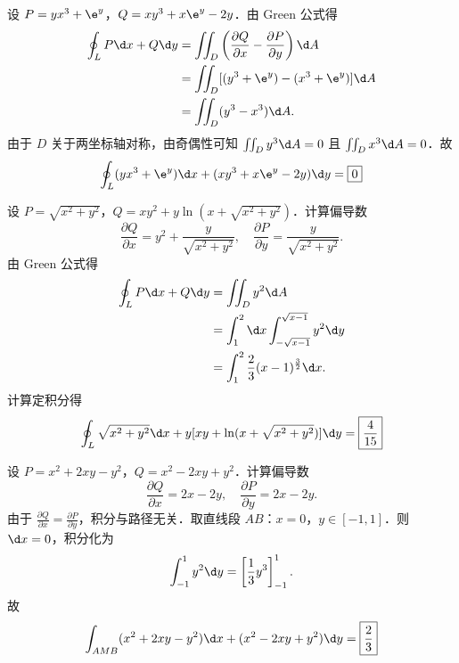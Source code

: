 \begin{solution}
    设 $P = yx^3 + \e^y$，$Q = xy^3 + x\e^y - 2y$．由 Green 公式得
    \begin{equation}
        \begin{aligned}
            \oint_L P \d x + Q \d y & = \iint_D \left( \frac{\partial Q}{\partial x} - \frac{\partial P}{\partial y} \right) \d A \\
                                    & = \iint_D [(y^3 + \e^y) - (x^3 + \e^y)] \d A                                                \\
                                    & = \iint_D (y^3 - x^3) \d A.
        \end{aligned}
    \end{equation}
    由于 $D$ 关于两坐标轴对称，由奇偶性可知 $\iint_D y^3 \d A = 0$ 且 $\iint_D x^3 \d A = 0$．故
    \begin{equation}
        \oint_L (yx^3 + \e^y) \d x + (xy^3 + x\e^y - 2y) \d y = \boxed{0}
    \end{equation}


    设 $P = \sqrt{x^2+y^2}$，$Q = xy^2 + y\ln(x + \sqrt{x^2+y^2})$．计算偏导数
    \begin{equation}
        \frac{\partial Q}{\partial x} = y^2 + \frac{y}{\sqrt{x^2+y^2}}, \quad \frac{\partial P}{\partial y} = \frac{y}{\sqrt{x^2+y^2}}.
    \end{equation}
    由 Green 公式得
    \begin{equation}
        \begin{aligned}
            \oint_L P \d x + Q \d y & = \iint_D y^2 \d A                                       \\
                                    & = \int_1^2 \d x \int_{-\sqrt{x-1}}^{\sqrt{x-1}} y^2 \d y \\
                                    & = \int_1^2 \frac{2}{3}(x-1)^{\frac{3}{2}} \d x.
        \end{aligned}
    \end{equation}
    计算定积分得
    \begin{equation}
        \oint_L \sqrt{x^2+y^2} \d x + y[xy + \ln(x + \sqrt{x^2+y^2})] \d y = \boxed{\frac{4}{15}}
    \end{equation}


    设 $P = x^2+2xy-y^2$，$Q = x^2-2xy+y^2$．计算偏导数
    \begin{equation}
        \frac{\partial Q}{\partial x} = 2x-2y, \quad \frac{\partial P}{\partial y} = 2x-2y.
    \end{equation}
    由于 $\frac{\partial Q}{\partial x} = \frac{\partial P}{\partial y}$，积分与路径无关．取直线段 $AB$：$x=0$，$y \in [-1, 1]$．则 $\d x = 0$，积分化为
    \begin{equation}
        \int_{-1}^1 y^2 \d y = \left[ \frac{1}{3}y^3 \right]_{-1}^1.
    \end{equation}
    故
    \begin{equation}
        \int_{AMB} (x^2+2xy-y^2) \d x + (x^2-2xy+y^2) \d y = \boxed{\frac{2}{3}}
    \end{equation}


\end{solution}
